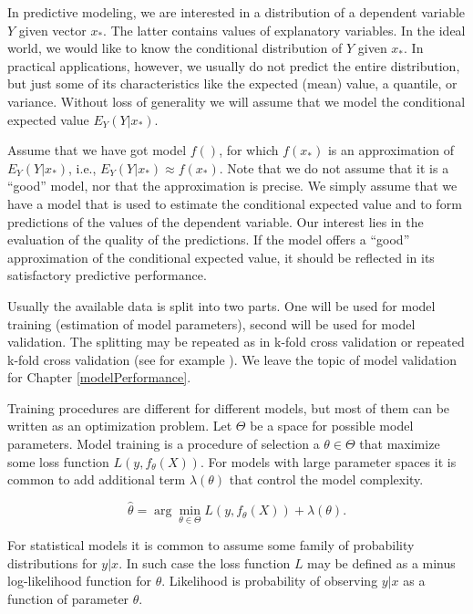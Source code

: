 \documentclass[12pt,]{krantz}
\begin{document}
In predictive modeling, we are interested in a distribution of a dependent variable \(Y\) given vector \(x_*\). The latter contains values of explanatory variables. In the ideal world, we would like to know the conditional distribution of \(Y\) given \(x_*\). In practical applications, however, we usually do not predict the entire distribution, but just some of its characteristics like the expected (mean) value, a quantile, or variance. Without loss of generality we will assume that we model the conditional expected value \(E_Y(Y | x_*)\).

Assume that we have got model \(f()\), for which \(f(x_*)\) is an approximation of \(E_Y(Y | x_*)\), i.e., \(E_Y(Y | x_*) \approx f(x_*)\). Note that we do not assume that it is a ``good'' model, nor that the approximation is precise. We simply assume that we have a model that is used to estimate the conditional expected value and to form predictions of the values of the dependent variable. Our interest lies in the evaluation of the quality of the predictions. If the model offers a ``good'' approximation of the conditional expected value, it should be reflected in its satisfactory predictive performance.

Usually the available data is split into two parts. One will be used for model training (estimation of model parameters), second will be used for model validation. The splitting may be repeated as in k-fold cross validation or repeated k-fold cross validation (see for example \citep{Kuhn2013}). We leave the topic of model validation for Chapter \ref{modelPerformance}.

Training procedures are different for different models, but most of them can be written as an optimization problem. Let \(\Theta\) be a space for possible model parameters. Model training is a procedure of selection a \(\theta \in \Theta\) that maximize some loss function \(L(y, f_\theta(X))\). For models with large parameter spaces it is common to add additional term \(\lambda(\theta)\) that control the model complexity.

\begin{equation}
\hat\theta = \arg \min_{\theta \in \Theta}  L (y, f_\theta(X)) + \lambda(\theta). 
\label{eq:modelTrainingEq1}
\end{equation}

For statistical models it is common to assume some family of probability distributions for \(y|x\). In such case the loss function \(L\) may be defined as a minus log-likelihood function for \(\theta\). Likelihood is probability of observing \(y|x\) as a function of parameter \(\theta\).
\end{document}
